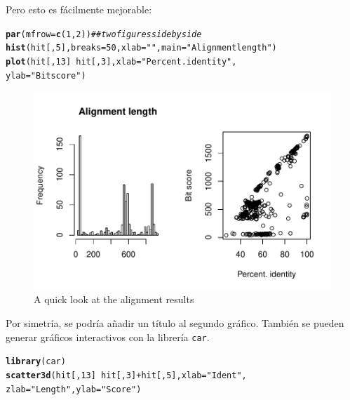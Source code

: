 \documentclass{config/apuntes}\usepackage[]{graphicx}\usepackage[]{xcolor}
\makeatletter
\def\maxwidth{ %
  \ifdim\Gin@nat@width>\linewidth
    \linewidth
  \else
    \Gin@nat@width
  \fi
}
\newcommand{\hlnum}[1]{\textcolor[rgb]{0.686,0.059,0.569}{#1}}%
\newcommand{\hlsng}[1]{\textcolor[rgb]{0.192,0.494,0.8}{#1}}%
\newcommand{\hlcom}[1]{\textcolor[rgb]{0.678,0.584,0.686}{\textit{#1}}}%
\newcommand{\hlopt}[1]{\textcolor[rgb]{0,0,0}{#1}}%
\newcommand{\hldef}[1]{\textcolor[rgb]{0.345,0.345,0.345}{#1}}%
\newcommand{\hlkwc}[1]{\textcolor[rgb]{0.333,0.667,0.333}{#1}}%
\newcommand{\hlkwd}[1]{\textcolor[rgb]{0.737,0.353,0.396}{\textbf{#1}}}%
\newenvironment{kframe}{%
 \def\at@end@of@kframe{}%
 \ifinner\ifhmode%
  \def\at@end@of@kframe{\end{minipage}}%
  \begin{minipage}{\columnwidth}%
 \fi\fi%
 \def\FrameCommand##1{\hskip\@totalleftmargin \hskip-\fboxsep
 \colorbox{shadecolor}{##1}\hskip-\fboxsep
     \hskip-\linewidth \hskip-\@totalleftmargin \hskip\columnwidth}%
 \MakeFramed {\advance\hsize-\width
   \@totalleftmargin\z@ \linewidth\hsize
   \@setminipage}}%
 {\par\unskip\endMakeFramed%
 \at@end@of@kframe}
\newenvironment{knitrout}{}{} %
\newcommand{\code}[1]{\texttt{#1}}
\makeatother
\begin{document}
Pero esto es fácilmente mejorable:
\begin{knitrout}
\color{fgcolor}\begin{kframe}
\begin{alltt}
\hlkwd{par}\hldef{(}\hlkwc{mfrow} \hldef{=} \hlkwd{c}\hldef{(}\hlnum{1}\hldef{,} \hlnum{2}\hldef{))} \hlcom{## two figures side by side}
\hlkwd{hist}\hldef{(hit[,} \hlnum{5}\hldef{],} \hlkwc{breaks} \hldef{=} \hlnum{50}\hldef{,} \hlkwc{xlab} \hldef{=} \hlsng{""}\hldef{,} \hlkwc{main} \hldef{=} \hlsng{"Alignment length"}\hldef{)}
\hlkwd{plot}\hldef{(hit[,} \hlnum{13}\hldef{]} \hlopt{~} \hldef{hit[,} \hlnum{3}\hldef{],} \hlkwc{xlab} \hldef{=} \hlsng{"Percent. identity"}\hldef{,}
     \hlkwc{ylab} \hldef{=} \hlsng{"Bit score"}\hldef{)}
\end{alltt}
\end{kframe}\begin{figure}
\includegraphics[width=\maxwidth]{figure/fig-blast-1} \caption[A quick look at the alignment results]{A quick look at the alignment results}\label{fig-blast}
\end{figure}

\end{knitrout}

Por simetría, se podría añadir un título al segundo gráfico. También se pueden generar gráficos interactivos con la librería \code{car}.
\begin{knitrout}
\color{fgcolor}\begin{kframe}
\begin{alltt}
\hlkwd{library}\hldef{(car)}
\hlkwd{scatter3d}\hldef{(hit[,} \hlnum{13}\hldef{]} \hlopt{~} \hldef{hit[,} \hlnum{3}\hldef{]} \hlopt{+} \hldef{hit[,} \hlnum{5}\hldef{],} \hlkwc{xlab} \hldef{=} \hlsng{"Ident"}\hldef{,}
          \hlkwc{zlab} \hldef{=} \hlsng{"Length"}\hldef{,} \hlkwc{ylab} \hldef{=} \hlsng{"Score"}\hldef{)}
\end{alltt}
\end{kframe}
\end{knitrout}
\end{document}
